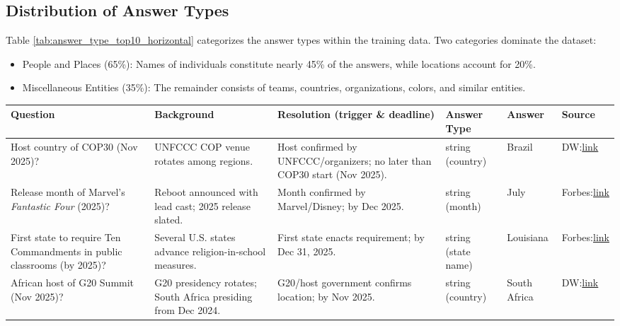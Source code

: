 \documentclass{article} %
\begin{document}
\subsection{Distribution of Answer Types}
Table \ref{tab:answer_type_top10_horizontal} categorizes the answer types within the training data. Two categories dominate the dataset:
\begin{itemize}
    \item People and Places (65\%): Names of individuals constitute nearly 45\% of the answers, while locations account for 20\%.
    \item Miscellaneous Entities (35\%): The remainder consists of teams, countries, organizations, colors, and similar entities.
\end{itemize}

\begin{table}[h]
\centering
\small
\setlength{\tabcolsep}{4pt}
\renewcommand{\arraystretch}{1.2}
\begin{tabularx}{\textwidth}{L L L L L L}
\toprule
\textbf{Question} & \textbf{Background} & \textbf{Resolution (trigger \& deadline)} & \textbf{Answer Type} & \textbf{Answer} & \textbf{Source} \\
\midrule
Host country of COP30 (Nov 2025)? & UNFCCC COP venue rotates among regions. & Host confirmed by UNFCCC/organizers; no later than COP30 start (Nov 2025). & string (country) & Brazil & DW:\newline \href{https://www.dw.com/en/donald-trump-climate-policy-2025/a-71354256?maca=en-rss-en-all-1573-xml-atom}{link} \\
\midrule
Release month of Marvel's \emph{Fantastic Four} (2025)? & Reboot announced with lead cast; 2025 release slated. & Month confirmed by Marvel/Disney; by Dec 2025. & string (month) & July & Forbes:\newline \href{https://www.forbes.com/sites/caileygleeson/2024/02/16/x-men-fans-push-back-against-anger-over-non-binary-character/}{link} \\
\midrule
First state to require Ten Commandments in public classrooms (by 2025)? & Several U.S. states advance religion-in-school measures. & First state enacts requirement; by Dec 31, 2025. & string (state name) & Louisiana & Forbes:\newline \href{https://www.forbes.com/sites/maryroeloffs/2024/06/20/louisianas-new-ten-commandments-law-is-latest-example-of-states-pushing-to-allow-religion-in-public-schools/}{link} \\
\midrule
African host of G20 Summit (Nov 2025)? & G20 presidency rotates; South Africa presiding from Dec 2024. & G20/host government confirms location; by Nov 2025. & string (country) & South Africa & DW:\newline \href{https://www.dw.com/en/africa-in-2025-strengthening-democracy-key-to-growth/a-70945864}{link} \\

\end{tabularx}
\end{table}
\end{document}
